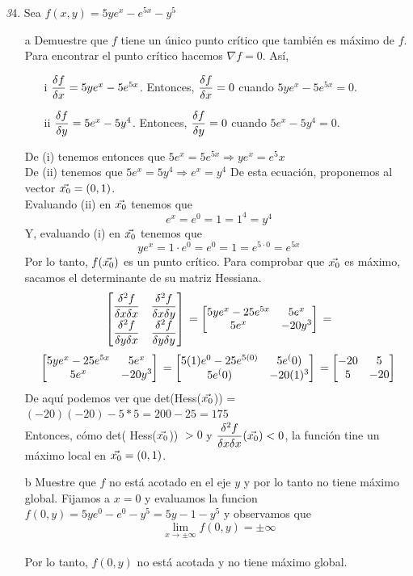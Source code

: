 \documentclass[a4paper,12pt]{article}
\begin{document}
\textit 34. Sea $f(x,y) = 5ye^x - e^{5x} -y^5$
\begin{itemize}
	\item[a] Demuestre que  $f$ tiene un único punto crítico que también es máximo de $f$.
	Para encontrar el punto crítico hacemos $\nabla f = 0$. Así,
	\begin{itemize}
		\item[i] $\dfrac{\delta f}{\delta x} = 5ye^x-5e^{5x}$. Entonces, $\dfrac{\delta f}{\delta x} = 0$ cuando $5ye^x-5e^{5x} = 0$.
		\item[ii]$\dfrac{\delta f}{\delta y} = 5e^x-5y^4$. Entonces, $\dfrac{\delta f}{\delta y} = 0$ cuando $5e^x-5y^4 = 0$.
	\end{itemize}
	De (i) tenemos entonces que $5e^x = 5e^{5x} \Rightarrow ye^x = e^5x$\\
	De (ii) tenemos que $5e^x = 5y^4 \Rightarrow e^x = y^4$ De esta ecuación, proponemos al vector $\vec{x_0} = (0,1)$.\\
	Evaluando (ii) en $\vec{x_0}$ tenemos que
	$$ e^x = e^0 = 1 = 1^4 = y^4$$
	Y, evaluando (i) en $\vec{x_0}$ tenemos que
	$$ye^x = 1\cdot e^0 = e^0 = 1 = e^{5\cdot 0} = e^{5x}$$
	Por lo tanto, $f(\vec{x_0})$ es un punto crítico.
	Para comprobar que $\vec{x_0}$ es máximo, sacamos el determinante de su matriz Hessiana.
	\[
	\begin{bmatrix}
	    \dfrac{\delta ^2 f}{\delta x \delta x} & \dfrac{\delta ^2 f}{\delta x \delta y}\\
		\dfrac{\delta ^2 f}{\delta y \delta x} & \dfrac{\delta ^2 f}{\delta y \delta y}\\
	\end{bmatrix}\\
	=
	\begin{bmatrix}
	    5ye^x - 25e^{5x} & 5e^x\\
		5e^x & -20y^3\\
	\end{bmatrix}\\
	=
	\]
	\[
	\begin{bmatrix}
	    5ye^x - 25e^{5x} & 5e^x\\
		5e^x & -20y^3\\
	\end{bmatrix}\\
	=
	\begin{bmatrix}
	    5(1)e^0 - 25e^{5(0)} & 5e^(0)\\
		5e^(0) & -20(1)^3\\
	\end{bmatrix}\\
	=
	\begin{bmatrix}
	    -20 & 5\\
		5 & -20\\
	\end{bmatrix}\\
	\]
	De aquí podemos ver que det(Hess($\vec{x_0}$)) = $(-20)(-20) - 5*5= 200 -25 = 175$\\
	Entonces, cómo det( Hess($\vec{x_0}$)) $>0$ y $\dfrac{\delta ^2 f}{\delta x \delta x}(\vec{x_0}) < 0 $, la función tine un máximo local en $\vec{x_0}= (0,1)$.
	\item[b] Muestre que $f$ no está acotado en el eje $y$ y por lo tanto no tiene máximo global.
	Fijamos a $x = 0$ y evaluamos la funcion $f(0,y)= 5ye^0-e^0-y^5 = 5y-1-y^5$ y observamos que \[ \lim_{x \to \pm \infty} f(0,y) = \pm \infty \]\\
	Por lo tanto, $f(0,y)$ no está acotada y no tiene máximo global.


\end{itemize}
\end{document}
